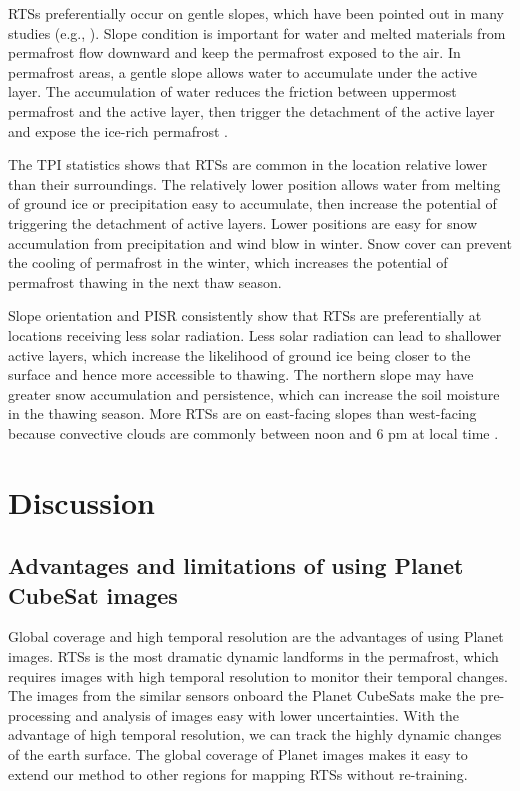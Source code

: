 \documentclass[preprint,12pt,authoryear]{elsarticle}
\begin{document}
RTSs preferentially occur on gentle slopes, which have been pointed out in many studies (e.g., \citealp{leibman1995cryogenic, niu2014thaw, lacelle_distribution_2015}). Slope condition is important for water and melted materials from permafrost flow downward and keep the permafrost exposed to the air. In permafrost areas, a gentle slope allows water to accumulate under the active layer. The accumulation of water reduces the friction between uppermost permafrost and the active layer,  then trigger the detachment of the active layer and expose the ice-rich permafrost \citep{mcroberts1974stability, mcroberts1974the}. 

The TPI statistics shows that RTSs are common in the location relative lower than their surroundings. The relatively lower position allows water from melting of ground ice or precipitation easy to accumulate, then increase the potential of triggering the detachment of active layers. Lower positions are easy for snow accumulation from precipitation and wind blow in winter. Snow cover can prevent the cooling of permafrost in the winter, which increases the potential of permafrost thawing in the next thaw season. 

Slope orientation and PISR consistently show that RTSs are preferentially at locations receiving less solar radiation. Less solar radiation can lead to shallower active layers, which increase the likelihood of ground ice being closer to the surface and hence more accessible to thawing. The northern slope may have greater snow accumulation and persistence, which can increase the soil moisture in the thawing season. More RTSs are on east-facing slopes than west-facing because convective clouds are commonly between noon and 6 pm at local time
\citep{niu2014thaw}.


\section{Discussion}
\label{sec_discussion}

\subsection{Advantages and limitations of using Planet CubeSat images}
\label{subsec_advantage_limitation_planet}

Global coverage and high temporal resolution are the advantages of using Planet images. RTSs is the most dramatic dynamic landforms in the permafrost, which requires images with high temporal resolution to monitor their temporal changes. The images from the similar sensors onboard the Planet CubeSats make the pre-processing and analysis of images easy with lower uncertainties. With the advantage of high temporal resolution, we can track the highly dynamic changes of the earth surface. 
The global coverage of Planet images makes it easy to extend our method to other regions for mapping RTSs without re-training. 
\end{document}

